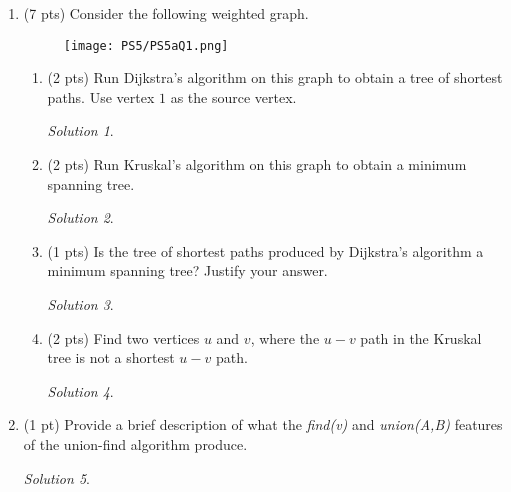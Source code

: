 \documentclass[12pt]{article}
\theoremstyle{remark}
\newtheorem*{solution}{Solution}
\begin{document}
\hrulefill

\newpage
\begin{enumerate}
\item (7 pts) Consider the following weighted graph. 
\begin{figure}[h!]
\begin{center}
\texttt{[image: PS5/PS5aQ1.png]} 
\end{center}
\end{figure}

\begin{enumerate}[label=(\alph*)]
\item (2 pts) Run Dijkstra's algorithm on this graph to obtain a tree of shortest paths. Use vertex $1$ as the source vertex.
\begin{solution}

\end{solution}
\pagebreak


\item (2 pts) Run Kruskal's algorithm on this graph to obtain a minimum spanning tree.
\begin{solution}

\end{solution}


\item (1 pts) Is the tree of shortest paths produced by Dijkstra's algorithm a minimum spanning tree? Justify your answer.
\begin{solution}

\end{solution}


\item (2 pts) Find two vertices $u$ and $v$, where the $u-v$ path in the Kruskal tree is not a shortest $u-v$ path.
\begin{solution}

\end{solution}

\end{enumerate}

\pagebreak
\item (1 pt) Provide a brief description of what the \textit{find(v)} and \textit{union(A,B)} features of the union-find algorithm produce. 
\begin{solution}


\end{solution}
\end{enumerate}
\end{document}
